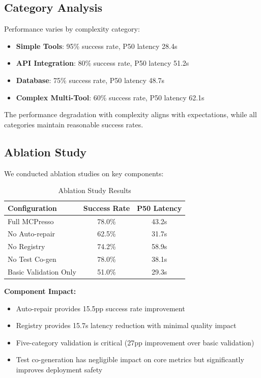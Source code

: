 \documentclass[10pt,twocolumn]{article}
\begin{document}
\subsection{Category Analysis}

Performance varies by complexity category:

\begin{itemize}
\item \textbf{Simple Tools}: 95\% success rate, P50 latency 28.4s
\item \textbf{API Integration}: 80\% success rate, P50 latency 51.2s  
\item \textbf{Database}: 75\% success rate, P50 latency 48.7s
\item \textbf{Complex Multi-Tool}: 60\% success rate, P50 latency 62.1s
\end{itemize}

The performance degradation with complexity aligns with expectations, while all categories maintain reasonable success rates.

\subsection{Ablation Study}

We conducted ablation studies on key components:

\begin{table}[h]
\centering
\begin{tabular}{lcc}
\toprule
\textbf{Configuration} & \textbf{Success Rate} & \textbf{P50 Latency} \\
\midrule
Full MCPresso & 78.0\% & 43.2s \\
No Auto-repair & 62.5\% & 31.7s \\
No Registry & 74.2\% & 58.9s \\
No Test Co-gen & 78.0\% & 38.1s \\
Basic Validation Only & 51.0\% & 29.3s \\
\bottomrule
\end{tabular}
\caption{Ablation Study Results}
\label{tab:ablation}
\end{table}

\textbf{Component Impact:}
\begin{itemize}
\item Auto-repair provides 15.5pp success rate improvement
\item Registry provides 15.7s latency reduction with minimal quality impact
\item Five-category validation is critical (27pp improvement over basic validation)
\item Test co-generation has negligible impact on core metrics but significantly improves deployment safety
\end{itemize}
\end{document}
